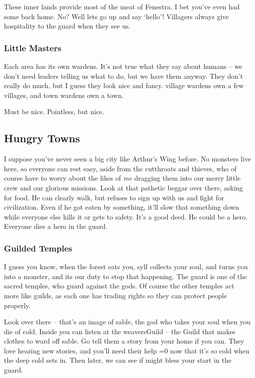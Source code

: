 \begin{multicols}{2}
\begin{exampletext}
  These inner lands provide most of the meat of Fenestra.
  I bet you've even had some back home.
  No?
  Well lets go up and say `hello'!
  Villagers always give hospitality to the \gls{guard} when they see us.

  \subsubsection*{Little Masters}

  Each area has its own \glspl{warden}.
  It's not true what they say about humans -- we don't need leaders telling us what to do, but we have them anyway.
  They don't really do much, but I guess they look nice and fancy.
  \Gls{village} \glspl{warden} own a few \glspl{village}, and town \glspl{warden} own a town.

  Must be nice.
  Pointless, but nice.

\subsection*{Hungry Towns}

  I suppose you've never seen a big city like Arthur's Wing before.
  No monsters live here, so everyone can rest easy, aside from the cutthroats and thieves, who of course have to worry about the likes of \emph{me} dragging them into our merry little crew and our glorious missions.
  Look at that pathetic beggar over there, asking for food.
  He can clearly walk, but refuses to sign up with us and fight for civilization.
  Even if he got eaten by something, it'll slow that something down while everyone else kills it or gets to safety.
  It's a good deed.
  He could be a hero.
  Everyone dies a hero in the \gls{guard}.

  \subsubsection*{Guilded Temples}

  I guess you know, when the forest eats you, \gls{sylf} collects your soul, and turns you into a monster, and its our duty to stop that happening.
  The \gls{guard} is one of the sacred temples, who guard against the gods.
  Of course the other temples act more like guilds, as each one has trading rights so they can protect people properly.

  Look over there -- that's an image of \gls{sable}, the god who takes your soul when you die of cold.
  Inside you can listen at the \gls{weaversGuild} -- the Guild that makes clothes to ward off \gls{sable}.
  Go tell them a story from your home if you can.
  They love hearing new stories, and you'll need their help \ifnum\value{temperature}=0 now that it's so cold \else when the deep cold sets in\fi.
  Then later, we can see if  might bless your start in the \gls{guard}.


\end{exampletext}
\end{multicols}
